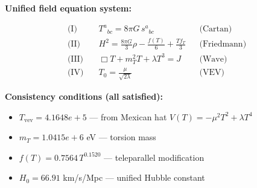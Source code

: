 
\textbf{Unified field equation system:}

\begin{align}
  \text{(I)} \quad & T^a{}_{bc} = 8\pi G \, s^a{}_{bc} && \text{(Cartan)} \\
  \text{(II)} \quad & H^2 = \frac{8\pi G}{3}\rho - \frac{f(T)}{6} + \frac{Tf_T}{3} && \text{(Friedmann)} \\
  \text{(III)} \quad & \Box T + m_T^2 T + \lambda T^3 = J && \text{(Wave)} \\
  \text{(IV)} \quad & T_0 = \frac{\mu}{\sqrt{2\lambda}} && \text{(VEV)}
\end{align}

\textbf{Consistency conditions (all satisfied):}
\begin{itemize}
  \item $T_{\text{vev}} = 4.1648e+5$ — from Mexican hat $V(T) = -\mu^2 T^2 + \lambda T^4$
  \item $m_T = 1.0415e+6$ eV — torsion mass
  \item $f(T) = 0.7564 \, T^{0.1520}$ — teleparallel modification
  \item $H_0 = 66.91$ km/s/Mpc — unified Hubble constant
\end{itemize}